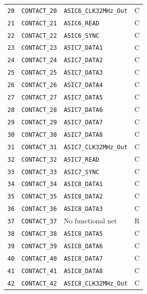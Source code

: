 \documentclass[10pt,a4paper]{article}
\begin{document}
\begin{longtable}{@{}P{15mm}P{42mm}P{92mm}P{10mm}@{}}
\nolinkurl{20} & \nolinkurl{CONTACT_20} & \nolinkurl{ASIC6_CLK32MHz_Out} & C \\
\nolinkurl{21} & \nolinkurl{CONTACT_21} & \nolinkurl{ASIC6_READ} & C \\
\nolinkurl{22} & \nolinkurl{CONTACT_22} & \nolinkurl{ASIC6_SYNC} & C \\
\nolinkurl{23} & \nolinkurl{CONTACT_23} & \nolinkurl{ASIC7_DATA1} & C \\
\nolinkurl{24} & \nolinkurl{CONTACT_24} & \nolinkurl{ASIC7_DATA2} & C \\
\nolinkurl{25} & \nolinkurl{CONTACT_25} & \nolinkurl{ASIC7_DATA3} & C \\
\nolinkurl{26} & \nolinkurl{CONTACT_26} & \nolinkurl{ASIC7_DATA4} & C \\
\nolinkurl{27} & \nolinkurl{CONTACT_27} & \nolinkurl{ASIC7_DATA5} & C \\
\nolinkurl{28} & \nolinkurl{CONTACT_28} & \nolinkurl{ASIC7_DATA6} & C \\
\nolinkurl{29} & \nolinkurl{CONTACT_29} & \nolinkurl{ASIC7_DATA7} & C \\
\nolinkurl{30} & \nolinkurl{CONTACT_30} & \nolinkurl{ASIC7_DATA8} & C \\
\nolinkurl{31} & \nolinkurl{CONTACT_31} & \nolinkurl{ASIC7_CLK32MHz_Out} & C \\
\nolinkurl{32} & \nolinkurl{CONTACT_32} & \nolinkurl{ASIC7_READ} & C \\
\nolinkurl{33} & \nolinkurl{CONTACT_33} & \nolinkurl{ASIC7_SYNC} & C \\
\nolinkurl{34} & \nolinkurl{CONTACT_34} & \nolinkurl{ASIC8_DATA1} & C \\
\nolinkurl{35} & \nolinkurl{CONTACT_35} & \nolinkurl{ASIC8_DATA2} & C \\
\nolinkurl{36} & \nolinkurl{CONTACT_36} & \nolinkurl{ASIC8_DATA3} & C \\
\nolinkurl{37} & \nolinkurl{CONTACT_37} & No functional net & R \\
\nolinkurl{38} & \nolinkurl{CONTACT_38} & \nolinkurl{ASIC8_DATA5} & C \\
\nolinkurl{39} & \nolinkurl{CONTACT_39} & \nolinkurl{ASIC8_DATA6} & C \\
\nolinkurl{40} & \nolinkurl{CONTACT_40} & \nolinkurl{ASIC8_DATA7} & C \\
\nolinkurl{41} & \nolinkurl{CONTACT_41} & \nolinkurl{ASIC8_DATA8} & C \\
\nolinkurl{42} & \nolinkurl{CONTACT_42} & \nolinkurl{ASIC8_CLK32MHz_Out} & C \\

\end{longtable}
\end{document}
